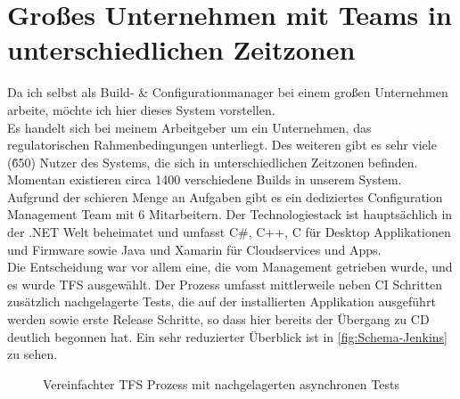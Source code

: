 \section{Großes Unternehmen mit Teams in unterschiedlichen Zeitzonen}
Da ich selbst als Build- \& Configurationmanager bei einem großen Unternehmen arbeite, möchte ich hier dieses System vorstellen.\\
Es handelt sich bei meinem Arbeitgeber um ein Unternehmen, das regulatorischen Rahmenbedingungen unterliegt. Des weiteren gibt es sehr viele (\~ 650) Nutzer des Systems, die sich in unterschiedlichen Zeitzonen befinden. Momentan existieren circa 1400 verschiedene Builds in unserem System. Aufgrund der schieren Menge an Aufgaben gibt es ein dediziertes Configuration Management Team mit 6 Mitarbeitern. Der Technologiestack ist hauptsächlich in der .NET Welt beheimatet und umfasst C\#, C++, C für Desktop Applikationen und Firmware sowie Java und Xamarin für Cloudservices und Apps.\\
Die Entscheidung war vor allem eine, die vom Management getrieben wurde, und es wurde TFS ausgewählt. Der Prozess umfasst mittlerweile neben CI Schritten zusätzlich nachgelagerte Tests, die auf der installierten Applikation ausgeführt werden sowie erste Release Schritte, so dass hier bereits der Übergang zu CD deutlich begonnen hat. Ein sehr reduzierter Überblick ist in \autoref{fig:Schema-Jenkins} zu sehen.
\begin{figure}[H]
  \centering
  \caption{Vereinfachter TFS Prozess mit nachgelagerten asynchronen Tests}\label{fig:Schema-TFS}
\end{figure}
